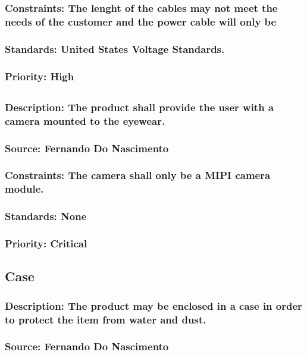 \subsubsection{Constraints: The lenght of the cables may not meet the needs of the customer and the power cable will only be}
\subsubsection{Standards: United States Voltage Standards.}
\subsubsection{Priority: High}

\subsection{\bfCamera}
\subsubsection{Description: The product shall provide the user with a camera mounted to the eyewear.}
\subsubsection{Source: Fernando Do Nascimento}
\subsubsection{Constraints: The camera shall only be a MIPI camera module.}
\subsubsection{Standards: None}
\subsubsection{Priority: Critical}

\subsection{\bfProtective Case}
\subsubsection{Description: The product may be enclosed in a case in order to protect the item from water and dust.}
\subsubsection{Source: Fernando Do Nascimento}
